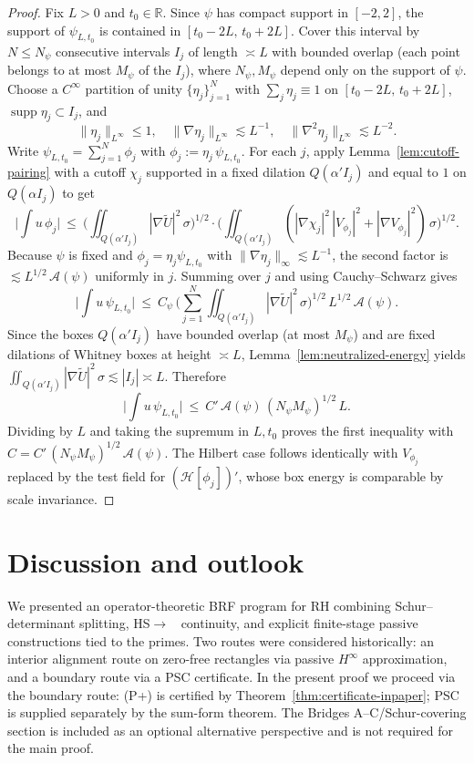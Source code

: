 \documentclass[11pt]{article}
\theoremstyle{definition}
\theoremstyle{remark}
\newcommand{\R}{\mathbb{R}}
\DeclareMathOperator{\dettwo}{det_2}
\begin{document}
\begin{proof}
Fix $L>0$ and $t_0\in\R$. Since $\psi$ has compact support in $[-2,2]$, the support of $\psi_{L,t_0}$ is contained in $[t_0-2L,\,t_0+2L]$. Cover this interval by $N\le N_\psi$ consecutive intervals $I_j$ of length $\asymp L$ with bounded overlap (each point belongs to at most $M_\psi$ of the $I_j$), where $N_\psi,M_\psi$ depend only on the support of $\psi$. Choose a $C^\infty$ partition of unity $\{\eta_j\}_{j=1}^{N}$ with $\sum_j \eta_j\equiv 1$ on $[t_0-2L,\,t_0+2L]$, $\operatorname{supp}\eta_j\subset I_j$, and
\[\|\eta_j\|_{L^\infty}\le 1,\quad \|\nabla\eta_j\|_{L^\infty}\lesssim L^{-1},\quad \|\nabla^2\eta_j\|_{L^\infty}\lesssim L^{-2}.\]
Write $\psi_{L,t_0}=\sum_{j=1}^{N}\phi_j$ with $\phi_j:=\eta_j\,\psi_{L,t_0}$. For each $j$, apply Lemma~\ref{lem:cutoff-pairing} with a cutoff $\chi_j$ supported in a fixed dilation $Q(\alpha' I_j)$ and equal to $1$ on $Q(\alpha I_j)$ to get
\[
 \Big|\int u\,\phi_j\Big|\ \le\ \Big(\iint_{Q(\alpha' I_j)} |\nabla \widetilde U|^2\,\sigma\Big)^{1/2}
 \cdot \Big(\iint_{Q(\alpha' I_j)} (|\nabla\chi_j|^2\,|V_{\phi_j}|^2+|\nabla V_{\phi_j}|^2)\,\sigma\Big)^{1/2}.
\]
Because $\psi$ is fixed and $\phi_j=\eta_j\psi_{L,t_0}$ with $\|\nabla\eta_j\|_\infty\lesssim L^{-1}$, the second factor is $\lesssim L^{1/2}\,\mathcal A(\psi)$ uniformly in $j$. Summing over $j$ and using Cauchy--Schwarz gives
\[\Big|\int u\,\psi_{L,t_0}\Big|\ \le\ C_\psi\,\Big(\sum_{j=1}^N \iint_{Q(\alpha' I_j)} |\nabla \widetilde U|^2\,\sigma\Big)^{1/2}\,L^{1/2}\,\mathcal A(\psi).\]
Since the boxes $Q(\alpha' I_j)$ have bounded overlap (at most $M_\psi$) and are fixed dilations of Whitney boxes at height $\asymp L$, Lemma~\ref{lem:neutralized-energy} yields $\iint_{Q(\alpha' I_j)} |\nabla \widetilde U|^2\,\sigma\lesssim |I_j|\asymp L$. Therefore
\[\Big|\int u\,\psi_{L,t_0}\Big|\ \le\ C'\,\mathcal A(\psi)\,(N_\psi M_\psi)^{1/2}\,L.\]
Dividing by $L$ and taking the supremum in $L,t_0$ proves the first inequality with $C=C'\,(N_\psi M_\psi)^{1/2}\,\mathcal A(\psi)$. The Hilbert case follows identically with $V_{\phi_j}$ replaced by the test field for $(\mathcal H[\phi_j])'$, whose box energy is comparable by scale invariance.\end{proof}

\iffalse %
\section{Discussion and outlook}\label{sec:discussion}
We presented an operator-theoretic BRF program for RH combining Schur--determinant splitting, HS\(\to\)\(\dettwo\) continuity, and explicit finite-stage passive constructions tied to the primes. Two routes were considered historically: an interior alignment route on zero-free rectangles via passive $H^\infty$ approximation, and a boundary route via a PSC certificate. In the present proof we proceed via the boundary route: (P+) is certified by Theorem~\ref{thm:certificate-inpaper}; PSC is supplied separately by the sum-form theorem. The Bridges A--C/Schur-covering section is included as an optional alternative perspective and is not required for the main proof.
\end{document}
